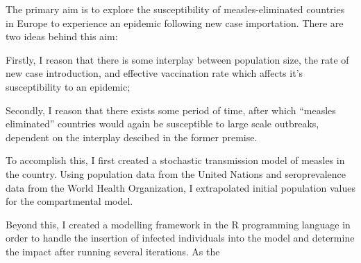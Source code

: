 \documentclass[../Paper.tex]{subfiles}
\begin{document}
  \justifying
  The primary aim is to explore the susceptibility of measles-eliminated
  countries in Europe to experience an epidemic following new case importation.
  There are two ideas behind this aim:

  Firstly, I reason that there is some interplay between population size,
  the rate of new case introduction, and effective vaccination rate which
  affects it's susceptibility to an epidemic;

  Secondly, I reason that there exists some period of time, after which ``measles eliminated''
  countries would again be susceptible to large scale outbreaks, dependent on
  the interplay descibed in the former premise.



  To accomplish this, I first created a stochastic transmission model of measles
  in the country. Using population data from the United Nations and seroprevalence
  data from the World Health Organization, I extrapolated initial population
  values for the compartmental model.

  Beyond this, I created a modelling framework in the R programming language
  in order to handle the insertion of infected individuals into the model and
  determine the impact after running several iterations. As the
  \clearpage
\end{document}
